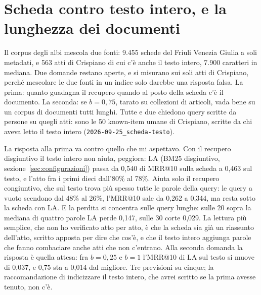 \section{Scheda contro testo intero, e la lunghezza dei documenti}\label{sec:scheda-testo}

Il corpus degli albi mescola due fonti: 9.455 schede del Friuli Venezia Giulia a
soli metadati, e 563 atti di Crispiano di cui c'è anche il testo intero, 7.900 caratteri in
mediana. Due domande restano aperte, e si misurano sui soli atti di
Crispiano, perché mescolare le due fonti in un indice solo darebbe una risposta
falsa. La prima: quanto guadagna il recupero quando al posto della scheda c'è il
documento. La seconda: se $b = 0{,}75$, tarato su collezioni di articoli, vada
bene su un corpus di documenti tutti lunghi. Tutte e due chiedono query scritte
da persone su quegli atti: sono le 50 known-item umane di Crispiano, scritte da
chi aveva letto il testo intero (\texttt{2026-09-25\_scheda-testo}).

La risposta alla prima va contro quello che mi aspettavo. Con il recupero
disgiuntivo il testo intero non aiuta, peggiora: LA (BM25 disgiuntivo, sezione~\ref{sec:configurazioni}) passa da 0,540 di MRR@10
sulla scheda a 0,463 sul testo, e l'atto fra i primi dieci dall'80\% al 78\%.
Aiuta solo il recupero congiuntivo, che sul testo trova più spesso tutte le
parole della query: le query a vuoto scendono dal 48\% al 26\%, l'MRR@10 sale da
0,262 a 0,344, ma resta sotto la scheda con LA. E la perdita si concentra sulle
query lunghe: sulle 20 sopra la mediana di quattro parole LA perde 0,147, sulle
30 corte 0,029. La lettura più semplice, che non ho verificato atto per atto,
è che la scheda sia già un riassunto dell'atto, scritto apposta per dire che
cos'è, e che il testo intero aggiunga parole che fanno combaciare anche atti che
non c'entrano. Alla seconda domanda la risposta è
quella attesa: fra $b = 0{,}25$ e $b = 1$ l'MRR@10 di LA sul testo si muove di
0,037, e 0,75 sta a 0,014 dal migliore. Tre previsioni su cinque; la
raccomandazione di indicizzare il testo intero, che avrei scritto se la prima
avesse tenuto, non c'è.
